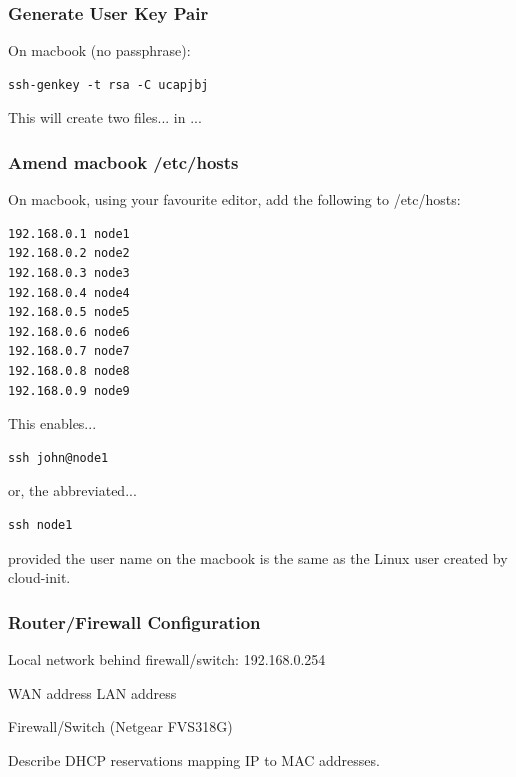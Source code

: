 \documentclass{article}
\begin{document}
\subsubsection{Generate User Key Pair}

On macbook (no passphrase):

\begin{lstlisting}[frame=single]
ssh-genkey -t rsa -C ucapjbj
\end{lstlisting}

This will create two files... in ...



\subsubsection{Amend macbook /etc/hosts}

On macbook, using your favourite editor, add the following to /etc/hosts:

\begin{lstlisting}[frame=single]
192.168.0.1 node1
192.168.0.2 node2
192.168.0.3 node3
192.168.0.4 node4
192.168.0.5 node5
192.168.0.6 node6
192.168.0.7 node7
192.168.0.8 node8
192.168.0.9 node9
\end{lstlisting}

This enables...

\begin{lstlisting}[frame=single]
ssh john@node1
\end{lstlisting}

or, the abbreviated...

\begin{lstlisting}[frame=single]
ssh node1
\end{lstlisting}

provided the user name on the macbook is the same as the Linux user created by cloud-init.



\subsubsection{Router/Firewall Configuration}

Local network behind firewall/switch: 192.168.0.254

WAN address
LAN address

Firewall/Switch (Netgear FVS318G)

Describe DHCP reservations mapping IP to MAC addresses.
\end{document}
